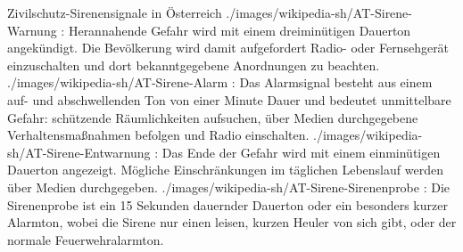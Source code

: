 \begin{PictureSeriesWide}{}{Zivilschutz-Sirenensignale in
Österreich\label{fig:zvivilschutz-sirenensignale-at}}
{./images/wikipedia-sh/AT-Sirene-Warnung}
{: Herannahende Gefahr wird mit einem
dreiminütigen Dauerton angekündigt. Die Bevölkerung wird
damit aufgefordert Radio- oder Fernsehgerät einzuschalten
und dort bekanntgegebene Anordnungen zu beachten.
}
{./images/wikipedia-sh/AT-Sirene-Alarm}
{: Das Alarmsignal besteht aus einem auf- und
abschwellenden Ton von einer Minute Dauer und bedeutet unmittelbare Gefahr:
schützende Räumlichkeiten aufsuchen, über Medien durchgegebene
Verhaltensmaßnahmen befolgen und Radio
einschalten. 
}
{./images/wikipedia-sh/AT-Sirene-Entwarnung}
{: Das Ende der Gefahr wird mit einem
einminütigen Dauerton angezeigt. Mögliche Einschränkungen im täglichen Lebenslauf
werden über Medien
durchgegeben.
}
{./images/wikipedia-sh/AT-Sirene-Sirenenprobe}
{: Die Sirenenprobe ist ein 15 Sekunden
dauernder Dauerton oder ein besonders kurzer Alarmton, wobei die Sirene nur einen
leisen, kurzen Heuler von sich gibt, oder der normale
Feuerwehralarmton.
}
% 

\end{PictureSeriesWide}

